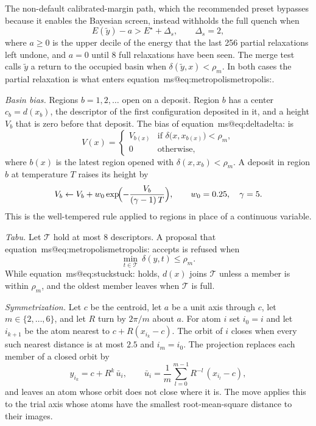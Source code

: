 \documentclass[journal=jctcce,manuscript=suppinfo]{achemso}
\makeatletter
\newcommand{\msref}[1]{\csname ms@#1\endcsname\mseqmark#1:\relax}
\def\mseqmark#1#2#3\relax{\ifx#1e\ifx#2q\ of the main text\fi\fi}
\makeatother
\begin{document}
The non-default calibrated-margin path, which the recommended preset
bypasses because it enables the Bayesian screen, instead withholds the full
quench when
\begin{equation}
E(\tilde y)-a>E^\star+\Delta_s,\qquad \Delta_s=2 ,
\label{eq:screen}
\end{equation}
where \(a\ge 0\) is the upper decile of the energy that the last 256
partial relaxations left undone, and \(a=0\) until 8 full relaxations have
been seen.
The merge test calls \(\tilde y\) a return to the occupied basin when
\(\delta(\tilde y,x)<\rho_m\).
In both cases the partial relaxation is what enters
equation~\msref{eq:metropolis}.

\emph{Basin bias.}
Regions \(b=1,2,\ldots\) open on a deposit.
Region \(b\) has a center \(c_b=d(x_b)\), the descriptor of the first
configuration deposited in it, and a height \(V_b\) that is zero before that
deposit.
The bias of equation~\msref{eq:delta} is
\begin{equation}
V(x) =
\begin{cases}
V_{b(x)} & \text{if } \delta\bigl(x,x_{b(x)}\bigr) < \rho_m,\\
0 & \text{otherwise,}
\end{cases}
\label{eq:bias}
\end{equation}
where \(b(x)\) is the latest region opened with
\(\delta(x,x_b)<\rho_m\).
A deposit in region \(b\) at temperature \(T\) raises its height by
\begin{equation}
V_b \leftarrow V_b + w_0\exp\!\Bigl(-\frac{V_b}{(\gamma-1)\,T}\Bigr),
\qquad w_0 = 0.25,\quad \gamma = 5 .
\label{eq:deposit}
\end{equation}
This is the well-tempered rule applied to regions in place of a continuous
variable.
\cite{Barducci_Bussi_Parrinello_2008}

\emph{Tabu.}
Let \(\mathcal{T}\) hold at most 8 descriptors.
A proposal that equation~\msref{eq:metropolis} accepts is refused when
\begin{equation}
\min_{t\in\mathcal{T}}\ \delta(y,t) \le \rho_m .
\label{eq:tabu}
\end{equation}
While equation~\msref{eq:stuck} holds, \(d(x)\) joins \(\mathcal{T}\) unless a
member is within \(\rho_m\), and the oldest member leaves when \(\mathcal{T}\)
is full.

\emph{Symmetrization.}
Let \(c\) be the centroid, let \(a\) be a unit axis through \(c\), let
\(m\in\{2,\ldots,6\}\), and let \(R\) turn by \(2\pi/m\) about \(a\).
For atom \(i\) set \(i_0=i\) and let \(i_{k+1}\) be the atom nearest to
\(c+R(x_{i_k}-c)\).
The orbit of \(i\) closes when every such nearest distance is at most
\(2.5\) and \(i_m=i_0\).
The projection replaces each member of a closed orbit by
\begin{equation}
y_{i_k} = c + R^{k}\,\bar u_i,
\qquad
\bar u_i = \frac1m\sum_{l=0}^{m-1} R^{-l}\,(x_{i_l}-c),
\label{eq:symmetrize}
\end{equation}
and leaves an atom whose orbit does not close where it is.
The move applies this to the trial axis whose atoms have the smallest
root-mean-square distance to their images.
\cite{oakley2013}
\end{document}
